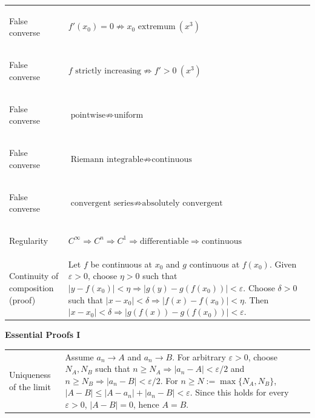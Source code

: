 {\begin{minipage}[t]{0.495\textwidth}
\begin{tabular}{
    @{}
    >{\bfseries\raggedright\arraybackslash}p{2.9cm}
    >{\raggedright\arraybackslash}p{10.5cm}
    @{}
}
False converse &
$f'(x_0)=0\not\Rightarrow x_0\text{ extremum}\ (x^3)$ \\

False converse &
$f\text{ strictly increasing}\not\Rightarrow f'>0\ (x^3)$ \\

False converse &
$\text{pointwise}\not\Rightarrow\text{uniform}$ \\

False converse &
$\text{Riemann integrable}\not\Rightarrow\text{continuous}$ \\

False converse &
$\text{convergent series}\not\Rightarrow
\text{absolutely convergent}$ \\

Regularity &
$C^\infty\Rightarrow C^n\Rightarrow C^1
\Rightarrow\text{differentiable}
\Rightarrow\text{continuous}$ \\


\bottomrule

\addlinespace[2mm]

\bottomrule

Continuity of composition (proof) &
Let $f$ be continuous at $x_0$ and $g$ continuous at $f(x_0)$. Given
$\varepsilon>0$, choose $\eta>0$ such that
$
|y-f(x_0)|<\eta
\Rightarrow
|g(y)-g(f(x_0))|<\varepsilon.
$
Choose $\delta>0$ such that
$
|x-x_0|<\delta
\Rightarrow
|f(x)-f(x_0)|<\eta.
$
Then
$
|x-x_0|<\delta
\Rightarrow
|g(f(x))-g(f(x_0))|<\varepsilon.
$
\\
\bottomrule
\end{tabular}

\end{minipage}
\hfill
\begin{minipage}[t]{0.495\textwidth}
\vspace{0pt}

\textbf{\large Essential Proofs I}\par
\vspace{2pt}

\begin{tabular}{
    @{}
    >{\bfseries\raggedright\arraybackslash}p{3.0cm}
    >{\raggedright\arraybackslash}p{10.4cm}
    @{}
}
\toprule

Uniqueness of the limit &
Assume $a_n\to A$ and $a_n\to B$. For arbitrary $\varepsilon>0$, choose
$N_A,N_B$ such that
$n\ge N_A\Rightarrow |a_n-A|<\varepsilon/2$ and
$n\ge N_B\Rightarrow |a_n-B|<\varepsilon/2$.
For $n\ge N:=\max\{N_A,N_B\}$,
$
|A-B|
\le |A-a_n|+|a_n-B|
<\varepsilon.
$
Since this holds for every $\varepsilon>0$, $|A-B|=0$, hence $A=B$.
\\


\end{tabular}
\end{minipage}}
